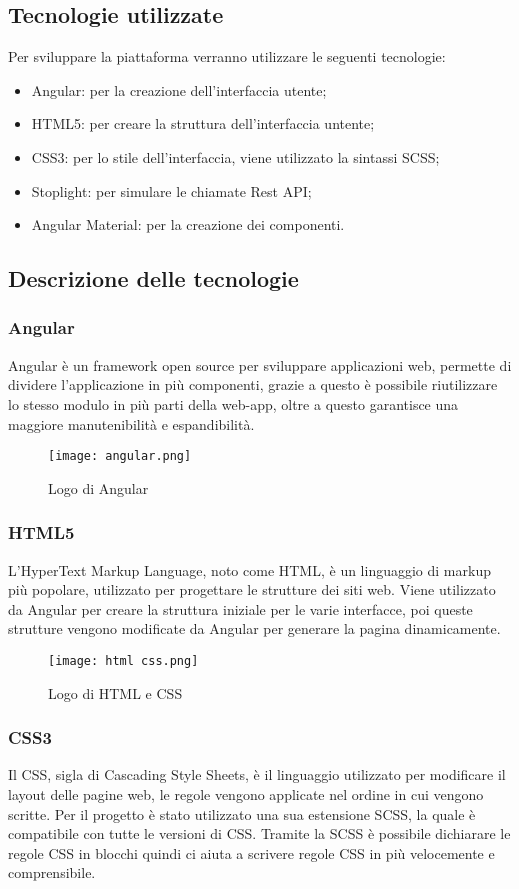 \subsection{Tecnologie utilizzate}
Per sviluppare la piattaforma verranno utilizzare le seguenti tecnologie:
\begin{itemize}
    \item Angular: per la creazione dell'interfaccia utente;
    \item HTML5: per creare la struttura dell'interfaccia untente;
    \item CSS3: per lo stile dell'interfaccia, viene utilizzato la sintassi SCSS;
    \item Stoplight: per simulare le chiamate Rest API;
    \item Angular Material: per la creazione dei componenti.
\end{itemize}
\subsection{Descrizione delle tecnologie}
\subsubsection{Angular}
Angular è un framework open source per sviluppare applicazioni web, permette di dividere l'applicazione in più componenti, grazie a questo è possibile riutilizzare lo stesso modulo in più parti della web-app, oltre a questo garantisce una maggiore manutenibilità e espandibilità.
\begin{figure}[H]
    \centering
    \texttt{[image: angular.png]}
    \caption{Logo di Angular}
\end{figure}
\subsubsection{HTML5}
L'HyperText Markup Language, noto come HTML, è un linguaggio di markup più popolare, utilizzato per progettare le strutture dei siti web. Viene utilizzato da Angular per creare la struttura iniziale per le varie interfacce, poi queste strutture vengono modificate da Angular per generare la pagina dinamicamente. 
\begin{figure}[H]
    \centering
    \texttt{[image: html css.png]}
    \caption{Logo di HTML e CSS}
\end{figure}
\subsubsection{CSS3}
Il CSS, sigla di Cascading Style Sheets, è il linguaggio utilizzato per modificare il layout delle pagine web, le regole vengono applicate nel ordine in cui vengono scritte. Per il progetto è stato utilizzato una sua estensione SCSS, la quale è compatibile con tutte le versioni di CSS. Tramite la SCSS è possibile dichiarare le regole CSS in blocchi quindi ci aiuta a scrivere regole CSS in più velocemente e comprensibile.
